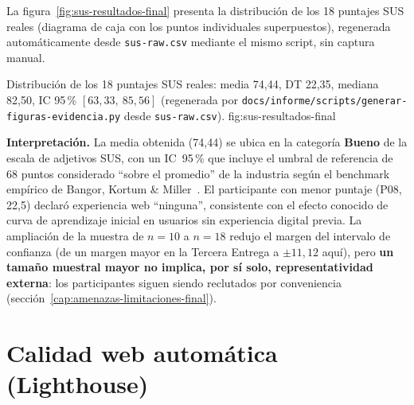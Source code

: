 La figura~\ref{fig:sus-resultados-final} presenta la distribuci\'on de
los 18 puntajes SUS reales (diagrama de caja con los puntos individuales
superpuestos), regenerada autom\'aticamente desde \texttt{sus-raw.csv}
mediante el mismo script, sin captura manual.

%
{Distribuci\'on de los 18 puntajes SUS reales: media 74{,}44, DT 22{,}35, mediana 82{,}50, IC 95\,\% $[63{,}33,\ 85{,}56]$ (regenerada por \texttt{docs/informe/scripts/generar-figuras-evidencia.py} desde \texttt{sus-raw.csv}).}%
{fig:sus-resultados-final}

\textbf{Interpretaci\'on.} La media obtenida (74{,}44) se ubica en la
categor\'ia \textbf{Bueno} de la escala de adjetivos SUS, con un IC~95\,\%
que incluye el umbral de referencia de 68 puntos considerado ``sobre el
promedio'' de la industria seg\'un el benchmark emp\'irico de Bangor,
Kortum \& Miller~\cite{bangor2008sus}. El participante con menor puntaje
(P08, 22{,}5) declar\'o experiencia web ``ninguna'', consistente con el
efecto conocido de curva de aprendizaje inicial en usuarios sin experiencia
digital previa. La ampliaci\'on de la muestra de $n=10$ a $n=18$ redujo el
margen del intervalo de confianza (de un margen mayor en la Tercera
Entrega a $\pm 11{,}12$ aqu\'i), pero \textbf{un tama\~no muestral mayor no
implica, por s\'i solo, representatividad externa}: los participantes
siguen siendo reclutados por conveniencia (secci\'on~\ref{cap:amenazas-limitaciones-final}).

\section{Calidad web autom\'atica (Lighthouse)}
\label{sec:lighthouse-final}

